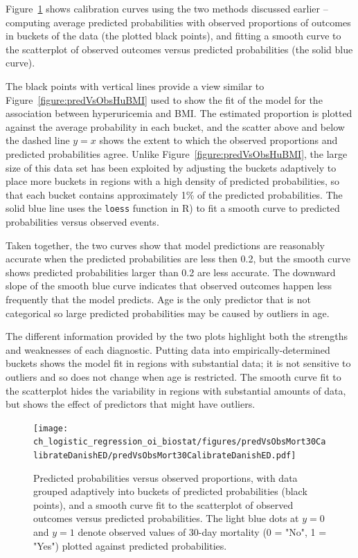 Figure~\ref{figure:predVsObsMort30CalibrateDanishED} shows calibration curves using the two methods discussed earlier -- computing average predicted probabilities with observed proportions of outcomes in buckets of the data (the plotted black points), and fitting a smooth curve to the scatterplot of observed outcomes versus predicted probabilities (the solid blue curve). 

The black points with vertical lines provide a view similar to Figure~\ref{figure:predVsObsHuBMI} used to show the fit of the model for the association between hyperuricemia and BMI\@. The estimated proportion is plotted against the average probability in each bucket, and the scatter above and below the dashed line $y = x$ shows the extent to which the observed proportions and predicted probabilities agree.   Unlike Figure~\ref{figure:predVsObsHuBMI},  the large size of this data set has been exploited by adjusting the buckets adaptively to place more buckets in regions with a high density of predicted probabilities, so that each bucket contains approximately 1\% of the predicted probabilities. The solid blue line uses the \texttt{loess} function in \textsf{R}) to fit a smooth curve to predicted probabilities versus observed events.

Taken together, the two curves show that model predictions are reasonably accurate when the predicted probabilities are less then 0.2, but the smooth curve shows predicted probabilities larger than 0.2 are less accurate. The downward slope of the smooth blue curve indicates that observed outcomes happen less frequently that the model predicts.   Age is the only predictor that is not categorical so large predicted probabilities may be caused by outliers in age.

The different information provided by the two plots highlight both the strengths and weaknesses of each diagnostic. Putting data into empirically-determined buckets shows the model fit in regions with substantial data;  it is not sensitive to outliers and so does not change when age is restricted.    The smooth curve fit to the scatterplot hides the variability in regions with substantial amounts of data, but shows the effect of predictors that might have outliers.



\begin{figure}[!tbh]
  \centering
  \texttt{[image: ch\_logistic\_regression\_oi\_biostat/figures/predVsObsMort30CalibrateDanishED/predVsObsMort30CalibrateDanishED.pdf]}
    \caption{Predicted probabilities versus observed proportions, with data grouped adaptively into buckets of predicted probabilities (black points), and a smooth curve fit to the scatterplot of observed outcomes versus predicted probabilities. The light blue dots at  $y = 0$ and $y = 1$ denote observed values of 30-day mortality (0 = "No", 1 = "Yes") plotted against predicted probabilities.}
    \label{figure:predVsObsMort30CalibrateDanishED}
\end{figure}

